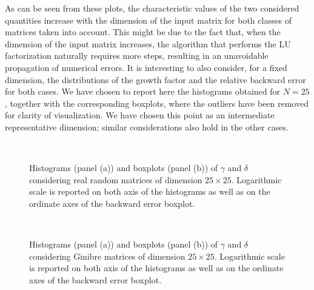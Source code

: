 \documentclass[a4paper,11pt]{report}
\begin{document}
\noindent As can be seen from these plots, the characteristic values of the two considered quantities increase with the dimension of the input matrix for both classes of matrices taken into account. This might be due to the fact that, when the dimension of the input matrix increases, the algorithm that performs the LU factorization naturally requires more steps, resulting in an unavoidable propagation of numerical errors. It is interesting to also consider, for a fixed dimension, the distributions of the growth factor and the relative backward error for both cases. We have chosen to report here the histograms obtained for $N=25$, together with the corresponding boxplots, where the outliers have been removed for clarity of visualization. We have chosen this point as an intermediate representative dimension; similar considerations also hold in the other cases.
\begin{figure}[H]
	\centering
	\ 
	\caption{Histograms (panel (a)) and boxplots (panel (b)) of $\gamma$ and $\delta$ considering real random matrices of dimension $25\times 25$. Logarithmic scale is reported on both axis of the histograms as well as on the ordinate axes of the backward error boxplot.}
	\label{fig:Distributions and boxplot Random Matrices N=25}
\end{figure}

\begin{figure}[H]
	\centering
	\ 
	\caption{Histograms (panel (a)) and boxplots (panel (b)) of $\gamma$ and $\delta$ considering Ginibre matrices of dimension $25\times 25$. Logarithmic scale is reported on both axis of the histograms as well as on the ordinate axes of the backward error boxplot.}
	\label{fig:Distributions and boxplot Ginibre Matrices N=25}
\end{figure}
\end{document}
